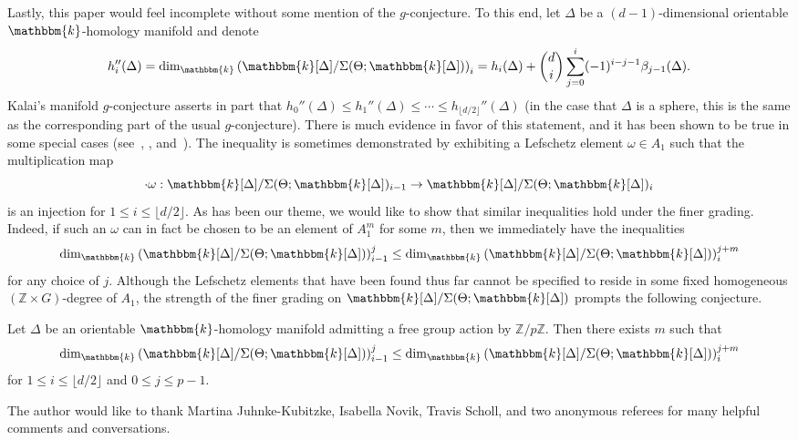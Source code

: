 \documentclass[ALCO,ThmDefs,Unicode]{cedram}
\newcommand{\field}{\mathbbm{k}}
\newcommand{\ZZ}{{\mathbb Z}}
\begin{document}
Lastly, this paper would feel incomplete without some mention of the $g$-conjecture. To this end, let $\Delta$ be a $(d-1)$-dimensional orientable $\field$-homology manifold and denote
\[
h_i''(\Delta)=\dim_\field \left(\field[\Delta]/\Sigma(\Theta;\field[\Delta])\right)_i=h_i(\Delta)+\binom{d}{i}\sum_{j=0}^i(-1)^{i-j-1}\beta_{j-1}(\Delta).
\]
Kalai's manifold $g$-conjecture asserts in part that $h_0''(\Delta)\le h_1''(\Delta)\le \cdots \le h_{\lfloor d/2\rfloor}''(\Delta)$ (in the case that $\Delta$ is a sphere, this is the same as the corresponding part of the usual $g$-conjecture). There is much evidence in favor of this statement, and it has been shown to be true in some special cases (see~\cite[Theorem~5.3]{Tight}, \cite[Theorem~1.5]{FaceNumbers}, and~\cite[Theorem~1.6]{NS-Gorenstein}). The inequality is sometimes demonstrated by exhibiting a Lefschetz element $\omega\in A_1$ such that the multiplication map
\[
\cdot\omega:\field[\Delta]/\Sigma(\Theta;\field[\Delta])_{i-1}\to\field[\Delta]/\Sigma(\Theta;\field[\Delta])_{i}
\]
is an injection for $1\le i\le \lfloor d/2\rfloor$. As has been our theme, we would like to show that similar inequalities hold under the finer grading. Indeed, if such an $\omega$ can in fact be chosen to be an element of $A_1^m$ for some $m$, then we immediately have the inequalities
\[
\dim_\field \left(\field[\Delta]/\Sigma(\Theta;\field[\Delta])\right)_{i-1}^j\le \dim_\field \left(\field[\Delta]/\Sigma(\Theta;\field[\Delta])\right)_i^{j+m}
\]
for any choice of $j$. Although the Lefschetz elements that have been found thus far cannot be specified to reside in some fixed homogeneous $(\ZZ\times G)$-degree of $A_1$, the strength of the finer grading on $\field[\Delta]/\Sigma(\Theta;\field[\Delta])$ prompts the following conjecture.

\begin{conjecture}
Let $\Delta$ be an orientable $\field$-homology manifold admitting a free group action by $\ZZ/p\ZZ$. Then there exists $m$ such that
\[
\dim_\field \left(\field[\Delta]/\Sigma(\Theta;\field[\Delta])\right)_{i-1}^j\le \dim_\field \left(\field[\Delta]/\Sigma(\Theta;\field[\Delta])\right)_i^{j+m}
\]
for $1\le i\le \lfloor d/2\rfloor$ and $0\le j\le p-1$.
\end{conjecture}

\longthanks The author would like to thank Martina Juhnke-Kubitzke, Isabella Novik, Travis Scholl, and two anonymous referees for many helpful comments and conversations.



\end{document}
